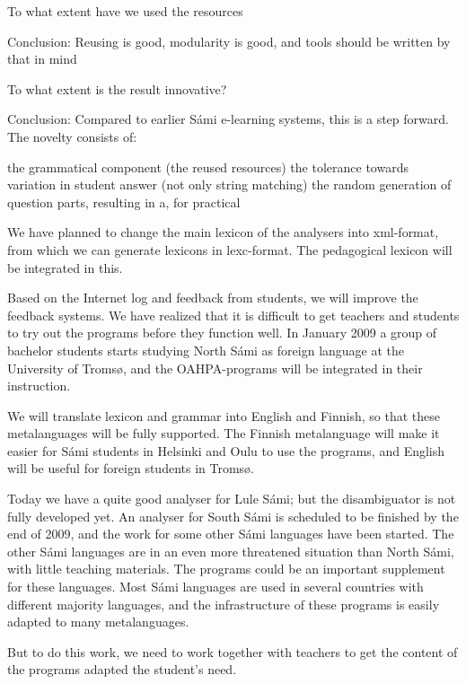 \documentclass[a4paper,12pt]{article}
\begin{document}
To what extent have we used the resources

Conclusion: Reusing is good, modularity is good, and tools should be written by that in mind

To what extent is the result innovative?

Conclusion: Compared to earlier Sámi e-learning systems, this is a step forward. The novelty consists of:

the grammatical component (the reused resources)
the tolerance towards variation in student answer (not only string matching)
the random generation of question parts, resulting in a, for practical 


We have planned to change the main lexicon of the analysers into xml-format, from which we can generate lexicons in lexc-format. The pedagogical lexicon will be integrated in this.

Based on the Internet log and feedback from students, we will improve the feedback systems. We have realized that it is difficult to get teachers and students to try out the programs before they function well. In January 2009 a group of bachelor students starts studying North Sámi as foreign language at the University of Tromsø, and the OAHPA-programs will be integrated in their instruction. 

We will translate lexicon and grammar into English and Finnish, so that these metalanguages will be fully supported. The Finnish metalanguage will make it easier for Sámi students in Helsinki and Oulu to use the programs, and English will be useful for foreign students in Tromsø.

Today we have a quite good analyser for Lule Sámi; but the disambiguator is not fully developed yet. An analyser for South Sámi is scheduled to be finished by the end of 2009, and the work for some other Sámi languages have been started. The other Sámi languages are in an even more threatened situation than North Sámi, with little teaching materials. The programs could be an important supplement for these languages. Most Sámi languages are used in several countries with different majority languages, and the infrastructure of these programs is easily adapted to many metalanguages.

But to do this work, we need to work together with teachers to get the content of the programs adapted the student's need.


\newpage

\par



	
\end{document}
